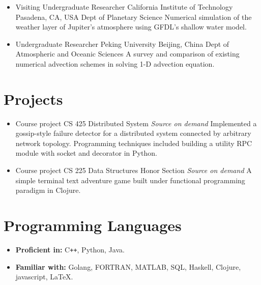 \documentclass[11pt,a4paper,sans]{moderncv}        %
\begin{document}
\begin{itemize}
	\item{
	      {Visiting Undergraduate Researcher}
	      {California Institute of Technology}
	      {Pasadena, CA, USA}
	      {Dept of Planetary Science}
	      {Numerical simulation of the weather layer of Jupiter's atmosphere using GFDL's shallow water model.}
	      }
	      
	\item{
	      {Undergraduate Researcher}
	      {Peking University}
	      {Beijing, China}
	      {Dept of Atmospheric and Oceanic Sciences}
	      {A survey and comparison of existing numerical advection schemes in solving 1-D advection equation.}
	      }
	      
\end{itemize}

\section{Projects}
\begin{itemize}
	\item{
	      {Course project}
	      {\vspace{-10pt}}
	      {}
	      {CS 425 Distributed System}
	      {\emph{Source on demand} \href{https://github.com/dataspread/dataspread-web}{\faGitlab}
		      Implemented a gossip-style failure detector for a distributed system connected by arbitrary network topology. Programming techniques included building a utility RPC module with socket and decorator in Python.}
	      }
	      
	\item{
	      {Course project}
	      {\vspace{-10pt}}
	      {}
	      {CS 225 Data Structures Honor Section}
	      {\emph{Source on demand} \href{https://github-dev.cs.illinois.edu/cs296-25-fa17/szhu28}{\faGithub}
		      A simple terminal text adventure game built under functional programming paradigm in Clojure.
	      }
	      }
	      
\end{itemize}

\section{Programming Languages}
\vspace{6pt}
\begin{itemize}
	\item \textbf{Proficient in:} C\texttt{++}, Python, Java.
	\item \textbf{Familiar with:} Golang, FORTRAN, MATLAB, SQL, Haskell, Clojure, javascript, \LaTeX.
\end{itemize}
\end{document}
